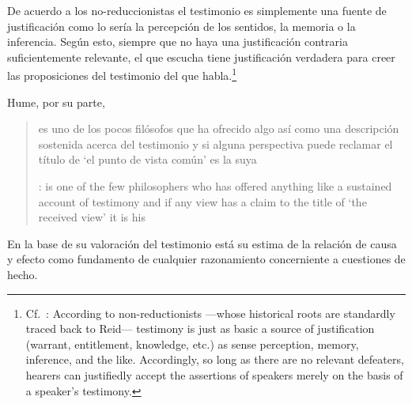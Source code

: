 De acuerdo a los no-reduccionistas el testimonio es simplemente una fuente de justificación como lo sería la percepción de los sentidos, la memoria o la inferencia. Según esto, siempre que no haya una justificación contraria suficientemente relevante, el que escucha tiene justificación verdadera para creer las proposiciones del testimonio del que habla.\footnote{Cf.~\cite[4]{lackeysosa2006eptest}: According to non-reductionists ---whose historical roots are standardly traced back to Reid--- testimony is just as basic a source of justification (warrant, entitlement, knowledge, etc.) as sense perception, memory, inference, and the like. Accordingly, so long as there are no relevant defeaters, hearers can justifiedly accept the assertions of speakers merely on the basis of a speaker's testimony.}

Hume, por su parte, \blockquote[{\cite[79]{coady1992test}}: is one of the few philosophers who has offered anything like a sustained account of testimony and if any view has a claim to the title of `the received view' it is his]{es uno de los pocos filósofos que ha ofrecido algo así como una descripción sostenida acerca del testimonio y si alguna perspectiva puede reclamar el título de `el punto de vista común' es la suya}. En la base de su valoración del testimonio está su estima de la relación de causa y efecto como fundamento de cualquier razonamiento concerniente a cuestiones de hecho.

